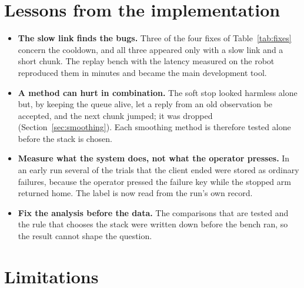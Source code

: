 

\section{Lessons from the implementation}

\begin{itemize}
\item \textbf{The slow link finds the bugs.} Three of the four fixes of Table~\ref{tab:fixes} concern the cooldown, and
      all three appeared only with a slow link and a short chunk. The replay bench with the latency measured on the
      robot reproduced them in minutes and became the main development tool.
\item \textbf{A method can hurt in combination.} The soft stop looked harmless alone but, by keeping the queue alive, let
      a reply from an old observation be accepted, and the next chunk jumped; it was dropped
      (Section~\ref{sec:smoothing}). Each smoothing method is therefore tested alone before the stack is chosen.
\item \textbf{Measure what the system does, not what the operator presses.} In an early run several of the
      trials that the client ended were stored as ordinary failures, because the operator pressed the failure key
      while the stopped arm returned home. The label is now read from the run's own record.
\item \textbf{Fix the analysis before the data.} The comparisons that are tested and the rule that chooses the stack
      were written down before the bench ran, so the result cannot shape the question.
\end{itemize}

\section{Limitations}\label{sec:limits}

